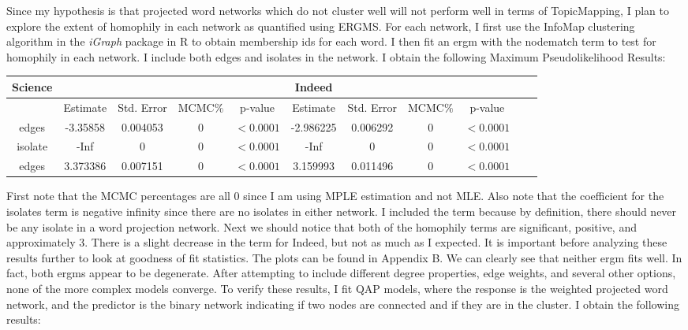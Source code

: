 \documentclass[12pt]{article}
\begin{document}
Since my hypothesis is that projected word networks which do not cluster well will not perform well in terms of TopicMapping, I plan to explore the extent of homophily in each network as quantified using ERGMS. For each network, I first use the InfoMap clustering algorithm in the \textit{iGraph} package in R to obtain membership ids for each word. I then fit an ergm with the nodematch term to test for homophily in each network. I include both edges and isolates in the network. I obtain the following Maximum Pseudolikelihood Results:
\vspace{2mm}
\begin{center}
	\begin{tabular}{ |c|c|c|c|c||c|c|c|c|c|c|  }
		\hline
		Science&&&&&Indeed&&& \\
		\hline
		&Estimate&Std. Error&MCMC$\%$&p-value&Estimate&Std. Error&MCMC$\%$&p-value \\ 
		\hline 
		edges&-3.35858&0.004053&0&$<0.0001$&-2.986225&0.006292&0&$<0.0001$\\
		isolate&-Inf&0&0&$<0.0001$&-Inf&0&0&$<0.0001$\\
		edges&3.373386&0.007151&0&$<0.0001$&3.159993&0.011496&0&$<0.0001$\\
		\hline
	\end{tabular}
\end{center}
\vspace{2mm}
First note that the MCMC percentages are all 0 since I am using MPLE estimation and not MLE. Also note that the coefficient for the isolates term is negative infinity since there are no isolates in either network. I included the term because by definition, there should never be any isolate in a word projection network. Next we should notice that both of the homophily terms are significant, positive, and approximately $3$. There is a slight decrease in the term for Indeed, but not as much as I expected. It is important before analyzing these results further to look at goodness of fit statistics. The plots can be found in Appendix B. We can clearly see that neither ergm fits well. In fact, both ergms appear to be degenerate. After attempting to include different degree properties, edge weights, and several other options, none of the more complex models converge. To verify these results, I fit QAP models, where the response is the weighted projected word network, and the predictor is the binary network indicating if two nodes are connected and if they are in the cluster. I obtain the following results:
\vspace{2mm}
\end{document}
